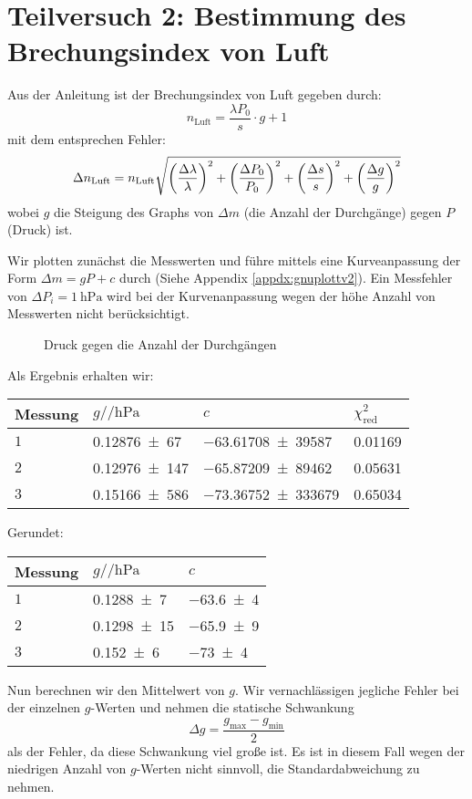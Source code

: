 \newcommand*{\nluft}[0]{n_{\text{Luft}}}

\section{Teilversuch 2: Bestimmung des Brechungsindex von Luft}
	Aus der Anleitung ist der Brechungsindex von Luft gegeben durch:
	\begin{equation}
		\nluft = \frac{\lambda P_0}{s}\cdot g + 1 
	\end{equation}
	mit dem entsprechen Fehler:
	\begin{align}
		\Delta \nluft = \nluft \relquad{\lambda,P_0,s,g}
	\end{align}
	wobei $g$ die Steigung des Graphs von $\Delta m$ (die Anzahl der Durchgänge) gegen $P$ (Druck) ist. 

	Wir plotten zunächst die Messwerten und führe mittels \gnuplot{} eine Kurveanpassung der Form $\Delta m = gP + c$ durch (Siehe Appendix \ref{appdx:gnuplottv2}). Ein Messfehler von $\Delta P_i = \SI{1}{\hecto\pascal}$ wird bei der Kurvenanpassung wegen der höhe Anzahl von Messwerten nicht berücksichtigt. 
	\begin{figure}[H]
		\centering
		
		\caption{\centering Druck gegen die Anzahl der Durchgängen}
		\label{fig:tv2-plot}
		\vspace{-1em}
	\end{figure}
	Als Ergebnis erhalten wir:
	\begin{center}
		\begin{tabular}{llll}
			\toprule
			Messung & $g/\si{\per\hecto\pascal}$ & $c$ & $\chi^2_\text{red}$ \\
			\midrule
				$1$ & \num{0,12876(67)} & \num{-63,61708(39587)} & \num{0,01169} \\
				$2$ & \num{0,12976(147)} & \num{-65,87209(89462)} & \num{0,05631} \\
				$3$ & \num{0,15166(586)} & \num{-73,36752(333679)} & \num{0,65034} \\
			\bottomrule
		\end{tabular}
	\end{center}
	Gerundet:
	\begin{center}
		\begin{tabular}{lll}
			\toprule
			Messung & $g/\si{\per\hecto\pascal}$ & $c$ \\
			\midrule
				$1$ & \num{0,1288(7)}  & \num{-63,6(4)}\\
				$2$ & \num{0,1298(15)} & \num{-65,9(9)}\\
				$3$ & \num{0,152(6)}   & \num{-73(4)}\\
			\bottomrule
		\end{tabular}
	\end{center}
	Nun berechnen wir den Mittelwert von $g$. Wir vernachlässigen jegliche Fehler bei der einzelnen $g$-Werten und nehmen die statische Schwankung $$\Delta g = \frac{g_{\text{max}} - g_\text{min}}{2}$$ als der Fehler, da diese Schwankung viel große ist. Es ist in diesem Fall wegen der niedrigen Anzahl von $g$-Werten nicht sinnvoll, die Standardabweichung zu nehmen. 


